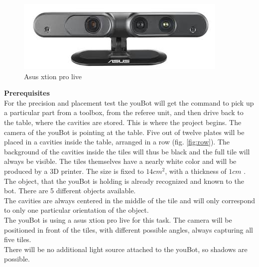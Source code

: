 \documentclass{article}
\begin{document}
\begin{figure}[h!]
\centering
\includegraphics[scale=0.5]{images/camera.jpeg}
\caption{Asus xtion pro live}
\label{fig:camera}
\end{figure}


\newpage


\textbf{Prerequisites}\\

For the precision and placement test the youBot will get the command to pick up a particular part from a toolbox, from the referee unit, and then drive back to the table, where the cavities are stored. This is where the project begins. The camera of the youBot is pointing at the table. Five out of twelve plates will be placed in a cavities inside the table, arranged in a row (fig. \ref{fig:row}). The background of the cavities inside the tiles will thus be black and the full tile will always be visible. The tiles themselves have a nearly white color and will be produced by a 3D printer. The size is fixed to $14cm^2$, with a thickness of  $1cm$ .\\
The object, that the youBot is holding is already recognized and known to the bot. There are 5 different objects available.\\
The cavities are always centered in the middle of the tile and will only correspond to only one particular orientation of the object.\\
The youBot is using a asus xtion pro live for this task. The camera will be positioned in front of the tiles, with different possible angles, always capturing all five tiles. \\
There will be no additional light source attached to the youBot, so shadows are possible.\\
\end{document}
